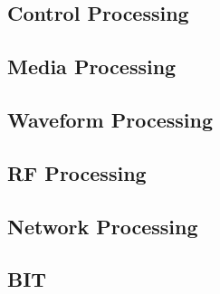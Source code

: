 \subsection{Control Processing}
\label{loc:Capability_Control}




\newpage
\subsection{Media Processing}
\label{loc:Capability_Media}




\newpage
\subsection{Waveform Processing}
\label{loc:Capability_Waveform}




\newpage
\subsection{RF Processing}
\label{loc:Capability_RFProcessing}



\newpage
\subsection{Network Processing}
\label{loc:Capability_Network}



\newpage
\subsection{BIT}
\label{loc:Capability_BIT}

